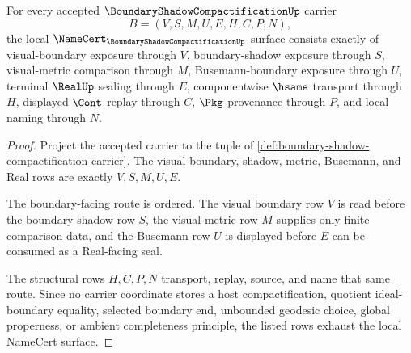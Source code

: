 \begin{theorem}
\label{thm:boundary-shadow-compactification-namecert-obligations}
For every accepted $\BoundaryShadowCompactificationUp$ carrier
$$
B=(V,S,M,U,E,H,C,P,N),
$$
the local $\NameCert_{\BoundaryShadowCompactificationUp}$ surface consists exactly of visual-boundary exposure through $V$, boundary-shadow exposure through $S$, visual-metric comparison through $M$, Busemann-boundary exposure through $U$, terminal $\RealUp$ sealing through $E$, componentwise $\hsame$ transport through $H$, displayed $\Cont$ replay through $C$, $\Pkg$ provenance through $P$, and local naming through $N$.
\end{theorem}
\begin{proof}
Project the accepted carrier to the tuple of \autoref{def:boundary-shadow-compactification-carrier}. The visual-boundary, shadow, metric, Busemann, and Real rows are exactly $V,S,M,U,E$.

The boundary-facing route is ordered. The visual boundary row $V$ is read before the boundary-shadow row $S$, the visual-metric row $M$ supplies only finite comparison data, and the Busemann row $U$ is displayed before $E$ can be consumed as a Real-facing seal.

The structural rows $H,C,P,N$ transport, replay, source, and name that same route. Since no carrier coordinate stores a host compactification, quotient ideal-boundary equality, selected boundary end, unbounded geodesic choice, global properness, or ambient completeness principle, the listed rows exhaust the local NameCert surface.
\end{proof}

